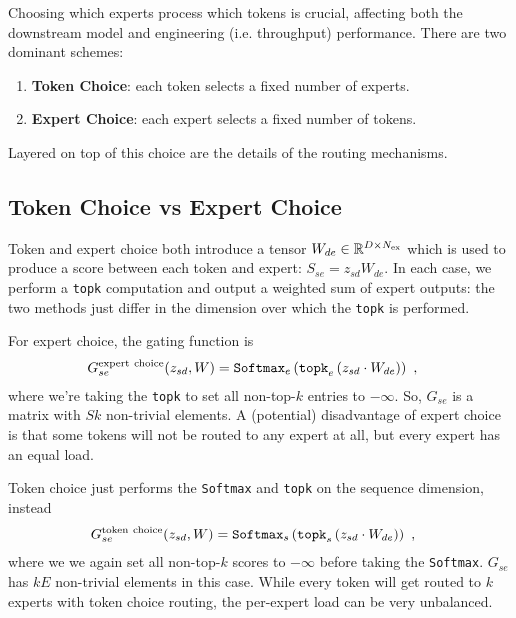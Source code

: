 Choosing which experts process which tokens is crucial, affecting both the downstream model and
engineering (i.e. throughput) performance.  There are two dominant schemes:
\begin{enumerate}
    \item \textbf{Token Choice}: each token selects a fixed number of experts.
    \item \textbf{Expert Choice}: each expert selects a fixed number of tokens.
\end{enumerate}
Layered on top of this choice are the details of the routing mechanisms.

\subsection{Token Choice vs Expert Choice}

Token and expert choice both introduce a tensor $W _{ de } \in \mathbb{R} ^{ D\times N _{ {\rm  ex}
} }$ which is used to produce a score between each token and expert: $ S _{ se } = z _{ sd } W _{ de
} $. In each case, we perform a \texttt{topk} computation and output a weighted sum of expert
outputs: the two methods just differ in the dimension over which the \texttt{topk} is performed.

For expert choice, the gating function is
\begin{align}
    G  ^{ {\rm  expert\ choice} }_{ se }(z _{ sd }, W)  &= \texttt{Softmax}_{ e } \left ( \texttt{topk} _{ e } \left ( z _{ sd } \cdot W _{ de }  \right ) \right ) \ , \label{eq_expert_choice}
\end{align}
where we're taking the \texttt{topk} to set all non-top-$ k $ entries to $ -\infty $. So, $ G _{ se
} $ is a matrix with $ Sk $ non-trivial elements. A (potential) disadvantage of expert choice is
that some tokens will not be routed to any expert at all, but every expert has an equal load.

Token choice just performs the \texttt{Softmax} and \texttt{topk} on the sequence dimension, instead
\begin{align}
    G  ^{ {\rm  token\ choice} }_{ se }(z _{ sd }, W)  &= \texttt{Softmax}_{ s } \left ( \texttt{topk} _{ s } \left ( z _{ sd } \cdot W _{ de }  \right ) \right ) \ , \label{eq_token_choice}
\end{align}
where we we again set all non-top-$ k $ scores to $ -\infty $ before taking the \texttt{Softmax}.
$ G _{ se } $ has $ kE $ non-trivial elements in this case. While every token will get routed to $ k
$ experts with token choice routing, the per-expert load can be very unbalanced.



